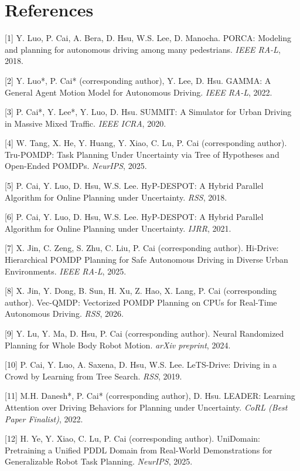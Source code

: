 \documentclass{article}
\begin{document}
\section*{References}
\small

[1] Y. Luo, P. Cai, A. Bera, D. Hsu, W.S. Lee, D. Manocha. PORCA: Modeling and planning for autonomous driving among many pedestrians. \textit{IEEE RA-L}, 2018.

[2] Y. Luo*, P. Cai* (corresponding author), Y. Lee, D. Hsu. GAMMA: A General Agent Motion Model for Autonomous Driving. \textit{IEEE RA-L}, 2022.

[3] P. Cai*, Y. Lee*, Y. Luo, D. Hsu. SUMMIT: A Simulator for Urban Driving in Massive Mixed Traffic. \textit{IEEE ICRA}, 2020.

[4] W. Tang, X. He, Y. Huang, Y. Xiao, C. Lu, P. Cai (corresponding author). Tru-POMDP: Task Planning Under Uncertainty via Tree of Hypotheses and Open-Ended POMDPs. \textit{NeurIPS}, 2025.

[5] P. Cai, Y. Luo, D. Hsu, W.S. Lee. HyP-DESPOT: A Hybrid Parallel Algorithm for Online Planning under Uncertainty. \textit{RSS}, 2018.

[6] P. Cai, Y. Luo, D. Hsu, W.S. Lee. HyP-DESPOT: A Hybrid Parallel Algorithm for Online Planning under Uncertainty. \textit{IJRR}, 2021.

[7] X. Jin, C. Zeng, S. Zhu, C. Liu, P. Cai (corresponding author). Hi-Drive: Hierarchical POMDP Planning for Safe Autonomous Driving in Diverse Urban Environments. \textit{IEEE RA-L}, 2025.

[8] X. Jin, Y. Dong, B. Sun, H. Xu, Z. Hao, X. Lang, P. Cai (corresponding author). Vec-QMDP: Vectorized POMDP Planning on CPUs for Real-Time Autonomous Driving. \textit{RSS}, 2026.

[9] Y. Lu, Y. Ma, D. Hsu, P. Cai (corresponding author). Neural Randomized Planning for Whole Body Robot Motion. \textit{arXiv preprint}, 2024.

[10] P. Cai, Y. Luo, A. Saxena, D. Hsu, W.S. Lee. LeTS-Drive: Driving in a Crowd by Learning from Tree Search. \textit{RSS}, 2019.

[11] M.H. Danesh*, P. Cai* (corresponding author), D. Hsu. LEADER: Learning Attention over Driving Behaviors for Planning under Uncertainty. \textit{CoRL (Best Paper Finalist)}, 2022.

[12] H. Ye, Y. Xiao, C. Lu, P. Cai (corresponding author). UniDomain: Pretraining a Unified PDDL Domain from Real-World Demonstrations for Generalizable Robot Task Planning. \textit{NeurIPS}, 2025.
\end{document}
